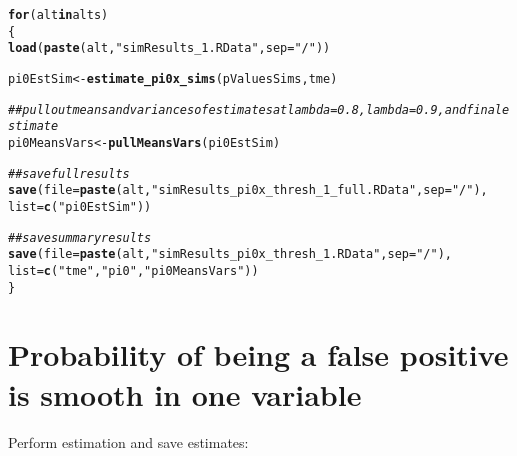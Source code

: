 \documentclass{article}\usepackage[]{graphicx}\usepackage[]{color}
\makeatletter
\newcommand{\hlstr}[1]{\textcolor[rgb]{0.192,0.494,0.8}{#1}}%
\newcommand{\hlcom}[1]{\textcolor[rgb]{0.678,0.584,0.686}{\textit{#1}}}%
\newcommand{\hlstd}[1]{\textcolor[rgb]{0.345,0.345,0.345}{#1}}%
\newcommand{\hlkwa}[1]{\textcolor[rgb]{0.161,0.373,0.58}{\textbf{#1}}}%
\newcommand{\hlkwb}[1]{\textcolor[rgb]{0.69,0.353,0.396}{#1}}%
\newcommand{\hlkwc}[1]{\textcolor[rgb]{0.333,0.667,0.333}{#1}}%
\newcommand{\hlkwd}[1]{\textcolor[rgb]{0.737,0.353,0.396}{\textbf{#1}}}%
\newenvironment{kframe}{%
 \def\at@end@of@kframe{}%
 \ifinner\ifhmode%
  \def\at@end@of@kframe{\end{minipage}}%
  \begin{minipage}{\columnwidth}%
 \fi\fi%
 \def\FrameCommand##1{\hskip\@totalleftmargin \hskip-\fboxsep
 \colorbox{shadecolor}{##1}\hskip-\fboxsep
     \hskip-\linewidth \hskip-\@totalleftmargin \hskip\columnwidth}%
 \MakeFramed {\advance\hsize-\width
   \@totalleftmargin\z@ \linewidth\hsize
   \@setminipage}}%
 {\par\unskip\endMakeFramed%
 \at@end@of@kframe}
\newenvironment{knitrout}{}{} %
\makeatother
\begin{document}
\begin{knitrout}
\color{fgcolor}\begin{kframe}
\begin{alltt}
\hlkwa{for}\hlstd{(alt} \hlkwa{in} \hlstd{alts)}
\hlstd{\{}
  \hlkwd{load}\hlstd{(}\hlkwd{paste}\hlstd{(alt,}\hlstr{"simResults_1.RData"}\hlstd{,}\hlkwc{sep}\hlstd{=}\hlstr{"/"}\hlstd{))}

  \hlstd{pi0EstSim} \hlkwb{<-} \hlkwd{estimate_pi0x_sims}\hlstd{(pValuesSims, tme)}

  \hlcom{##pull out means and variances of estimates at lambda=0.8, lambda=0.9, and final estimate}
  \hlstd{pi0MeansVars} \hlkwb{<-} \hlkwd{pullMeansVars}\hlstd{(pi0EstSim)}

  \hlcom{##save full results}
  \hlkwd{save}\hlstd{(}\hlkwc{file}\hlstd{=}\hlkwd{paste}\hlstd{(alt,}\hlstr{"simResults_pi0x_thresh_1_full.RData"}\hlstd{,}\hlkwc{sep}\hlstd{=}\hlstr{"/"}\hlstd{),}
       \hlkwc{list}\hlstd{=}\hlkwd{c}\hlstd{(}\hlstr{"pi0EstSim"}\hlstd{))}

  \hlcom{##save summary results}
  \hlkwd{save}\hlstd{(}\hlkwc{file}\hlstd{=}\hlkwd{paste}\hlstd{(alt,}\hlstr{"simResults_pi0x_thresh_1.RData"}\hlstd{,}\hlkwc{sep}\hlstd{=}\hlstr{"/"}\hlstd{),}
       \hlkwc{list}\hlstd{=}\hlkwd{c}\hlstd{(}\hlstr{"tme"}\hlstd{,} \hlstr{"pi0"}\hlstd{,} \hlstr{"pi0MeansVars"}\hlstd{))}
\hlstd{\}}
\end{alltt}
\end{kframe}
\end{knitrout}

\section{Probability of being a false positive is smooth in one variable}

Perform estimation and save estimates:
\end{document}
